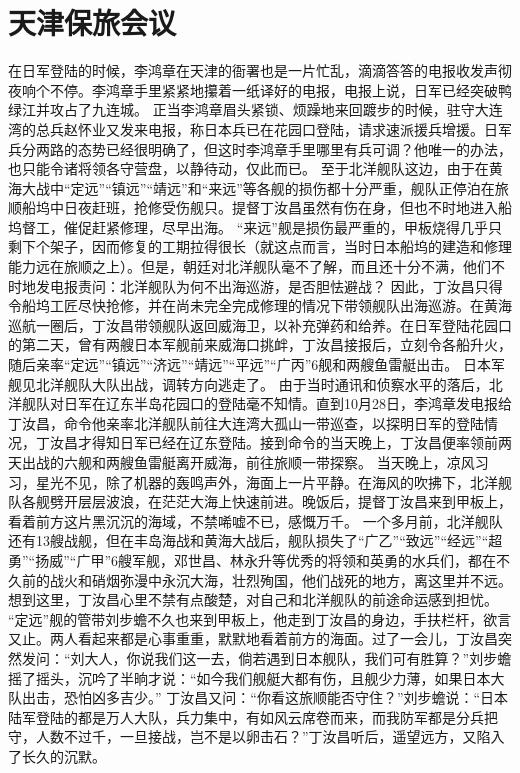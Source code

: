 \documentclass[12pt,UTF8]{ctexbook}
\begin{document}
\chapter{天津保旅会议}

在日军登陆的时候，李鸿章在天津的衙署也是一片忙乱，滴滴答答的电报收发声彻夜响个不停。李鸿章手里紧紧地攥着一纸译好的电报，电报上说，日军已经突破鸭绿江并攻占了九连城。
正当李鸿章眉头紧锁、烦躁地来回踱步的时候，驻守大连湾的总兵赵怀业又发来电报，称日本兵已在花园口登陆，请求速派援兵增援。日军兵分两路的态势已经很明确了，但这时李鸿章手里哪里有兵可调？他唯一的办法，也只能令诸将领各守营盘，以静待动，仅此而已。
至于北洋舰队这边，由于在黄海大战中“定远”“镇远”“靖远”和“来远”等各舰的损伤都十分严重，舰队正停泊在旅顺船坞中日夜赶班，抢修受伤舰只。提督丁汝昌虽然有伤在身，但也不时地进入船坞督工，催促赶紧修理，尽早出海。
“来远”舰是损伤最严重的，甲板烧得几乎只剩下个架子，因而修复的工期拉得很长（就这点而言，当时日本船坞的建造和修理能力远在旅顺之上）。但是，朝廷对北洋舰队毫不了解，而且还十分不满，他们不时地发电报责问：北洋舰队为何不出海巡游，是否胆怯避战？
因此，丁汝昌只得令船坞工匠尽快抢修，并在尚未完全完成修理的情况下带领舰队出海巡游。在黄海巡航一圈后，丁汝昌带领舰队返回威海卫，以补充弹药和给养。在日军登陆花园口的第二天，曾有两艘日本军舰前来威海口挑衅，丁汝昌接报后，立刻令各船升火，随后亲率“定远”“镇远”“济远”“靖远”“平远”“广丙”6舰和两艘鱼雷艇出击。
日本军舰见北洋舰队大队出战，调转方向逃走了。
由于当时通讯和侦察水平的落后，北洋舰队对日军在辽东半岛花园口的登陆毫不知情。直到10月28日，李鸿章发电报给丁汝昌，命令他亲率北洋舰队前往大连湾大孤山一带巡查，以探明日军的登陆情况，丁汝昌才得知日军已经在辽东登陆。接到命令的当天晚上，丁汝昌便率领前两天出战的六舰和两艘鱼雷艇离开威海，前往旅顺一带探察。
当天晚上，凉风习习，星光不见，除了机器的轰鸣声外，海面上一片平静。在海风的吹拂下，北洋舰队各舰劈开层层波浪，在茫茫大海上快速前进。晚饭后，提督丁汝昌来到甲板上，看着前方这片黑沉沉的海域，不禁唏嘘不已，感慨万千。
一个多月前，北洋舰队还有13艘战舰，但在丰岛海战和黄海大战后，舰队损失了“广乙”“致远”“经远”“超勇”“扬威”“广甲”6艘军舰，邓世昌、林永升等优秀的将领和英勇的水兵们，都在不久前的战火和硝烟弥漫中永沉大海，壮烈殉国，他们战死的地方，离这里并不远。想到这里，丁汝昌心里不禁有点酸楚，对自己和北洋舰队的前途命运感到担忧。
“定远”舰的管带刘步蟾不久也来到甲板上，他走到丁汝昌的身边，手扶栏杆，欲言又止。两人看起来都是心事重重，默默地看着前方的海面。过了一会儿，丁汝昌突然发问：“刘大人，你说我们这一去，倘若遇到日本舰队，我们可有胜算？”刘步蟾摇了摇头，沉吟了半晌才说：“如今我们舰艇大都有伤，且舰少力薄，如果日本大队出击，恐怕凶多吉少。”
丁汝昌又问：“你看这旅顺能否守住？”刘步蟾说：“日本陆军登陆的都是万人大队，兵力集中，有如风云席卷而来，而我防军都是分兵把守，人数不过千，一旦接战，岂不是以卵击石？”丁汝昌听后，遥望远方，又陷入了长久的沉默。
\end{document}
